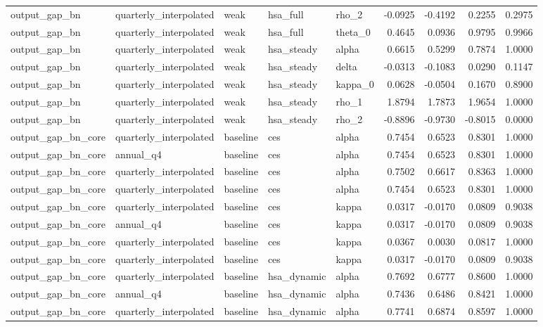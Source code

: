 \begin{tabular}{lllllrrrr}
output\_gap\_bn & quarterly\_interpolated & weak & hsa\_full & rho\_2 & -0.0925 & -0.4192 & 0.2255 & 0.2975 \\
output\_gap\_bn & quarterly\_interpolated & weak & hsa\_full & theta\_0 & 0.4645 & 0.0936 & 0.9795 & 0.9966 \\
output\_gap\_bn & quarterly\_interpolated & weak & hsa\_steady & alpha & 0.6615 & 0.5299 & 0.7874 & 1.0000 \\
output\_gap\_bn & quarterly\_interpolated & weak & hsa\_steady & delta & -0.0313 & -0.1083 & 0.0290 & 0.1147 \\
output\_gap\_bn & quarterly\_interpolated & weak & hsa\_steady & kappa\_0 & 0.0628 & -0.0504 & 0.1670 & 0.8900 \\
output\_gap\_bn & quarterly\_interpolated & weak & hsa\_steady & rho\_1 & 1.8794 & 1.7873 & 1.9654 & 1.0000 \\
output\_gap\_bn & quarterly\_interpolated & weak & hsa\_steady & rho\_2 & -0.8896 & -0.9730 & -0.8015 & 0.0000 \\
output\_gap\_bn\_core & quarterly\_interpolated & baseline & ces & alpha & 0.7454 & 0.6523 & 0.8301 & 1.0000 \\
output\_gap\_bn\_core & annual\_q4 & baseline & ces & alpha & 0.7454 & 0.6523 & 0.8301 & 1.0000 \\
output\_gap\_bn\_core & quarterly\_interpolated & baseline & ces & alpha & 0.7502 & 0.6617 & 0.8363 & 1.0000 \\
output\_gap\_bn\_core & quarterly\_interpolated & baseline & ces & alpha & 0.7454 & 0.6523 & 0.8301 & 1.0000 \\
output\_gap\_bn\_core & quarterly\_interpolated & baseline & ces & kappa & 0.0317 & -0.0170 & 0.0809 & 0.9038 \\
output\_gap\_bn\_core & annual\_q4 & baseline & ces & kappa & 0.0317 & -0.0170 & 0.0809 & 0.9038 \\
output\_gap\_bn\_core & quarterly\_interpolated & baseline & ces & kappa & 0.0367 & 0.0030 & 0.0817 & 1.0000 \\
output\_gap\_bn\_core & quarterly\_interpolated & baseline & ces & kappa & 0.0317 & -0.0170 & 0.0809 & 0.9038 \\
output\_gap\_bn\_core & quarterly\_interpolated & baseline & hsa\_dynamic & alpha & 0.7692 & 0.6777 & 0.8600 & 1.0000 \\
output\_gap\_bn\_core & annual\_q4 & baseline & hsa\_dynamic & alpha & 0.7436 & 0.6486 & 0.8421 & 1.0000 \\
output\_gap\_bn\_core & quarterly\_interpolated & baseline & hsa\_dynamic & alpha & 0.7741 & 0.6874 & 0.8597 & 1.0000 \\

\end{tabular}
